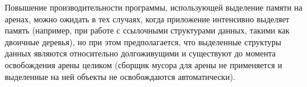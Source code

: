Повышение производительности программы, использующей выделение памяти на аренах, можно ожидать в тех случаях, когда приложение интенсивно выделяет память (например, при работе с ссылочными структурами данных, такими как двоичные деревья), но при этом предполагается, что выделенные структуры данных являются относительно долгоживущими и существуют до момента освобождения арены целиком (сборщик мусора для арены не применяется и выделенные на ней объекты не освобождаются автоматически). 


%
%
%
%
%
%
%
%
%
%
%
